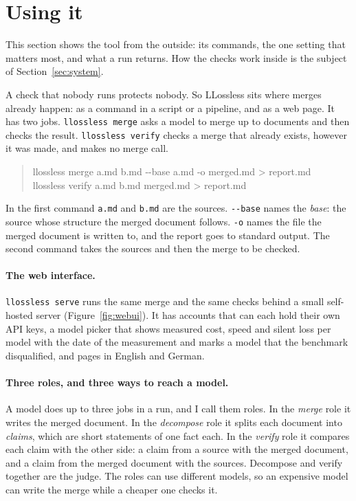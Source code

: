 \section{Using it}
\label{sec:usage}

This section shows the tool from the outside: its commands, the one setting that matters most, and what a run returns. How the checks work inside is the subject of Section~\ref{sec:system}.

A check that nobody runs protects nobody. So LLossless sits where merges already happen: as a command in a script or a pipeline, and as a web page. It has two jobs. \texttt{llossless merge} asks a model to merge up to  documents and then checks the result. \texttt{llossless verify} checks a merge that already exists, however it was made, and makes no merge call.

\begin{quote}\small\ttfamily
llossless merge a.md b.md -{}-base a.md -o merged.md > report.md\\
llossless verify a.md b.md merged.md > report.md
\end{quote}

\noindent In the first command \texttt{a.md} and \texttt{b.md} are the sources. \texttt{-{}-base} names the \emph{base}: the source whose structure the merged document follows. \texttt{-o} names the file the merged document is written to, and the report goes to standard output. The second command takes the sources and then the merge to be checked.

\paragraph{The web interface.} \texttt{llossless serve} runs the same merge and the same checks behind a small self-hosted server (Figure~\ref{fig:webui}). It has accounts that can each hold their own API keys, a model picker that shows measured cost, speed and silent loss per model with the date of the measurement and marks a model that the benchmark disqualified, and pages in English and German.

\paragraph{Three roles, and three ways to reach a model.} A model does up to three jobs in a run, and I call them roles. In the \emph{merge} role it writes the merged document. In the \emph{decompose} role it splits each document into \emph{claims}, which are short statements of one fact each. In the \emph{verify} role it compares each claim with the other side: a claim from a source with the merged document, and a claim from the merged document with the sources. Decompose and verify together are the judge. The roles can use different models, so an expensive model can write the merge while a cheaper one checks it.

